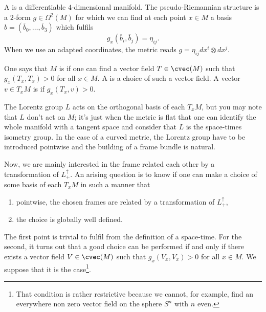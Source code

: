 A  is a differentiable  $4$-dimensional manifold. The pseudo-Riemannian structure is a $2$-form $g\in\Omega^2(M)$ for which we can find at each point $x\in M$ a basis $b=(\overline{ b }_0,\ldots,\overline{ b }_3)$ which fulfils
\[
  g_x(\overline{ b }_i,\overline{ b }_j)=\eta_{ij}.
\]
When we use an adapted coordinates, the metric reads $g=\eta_{ij}dx^i\otimes dx^j$.

One says that $M$ is  if one can find a vector field $T\in\cvec(M)$ such that $g_x(T_x,T_x)>0$ for all $x\in M$. A  is a choice of such a vector field. A vector $v\in T_xM$ is  if $g_x(T_x,v)>0$.

The Lorentz group $L$ acts on the orthogonal basis of each $T_xM$, but you may note that $L$ don't act on $M$; it's just when the metric is flat that one can identify the whole manifold with a tangent space and consider that $L$ is the space-times isometry group. In the case of a curved metric, the Lorentz group have to be introduced pointwise and the building of a frame bundle is natural.

Now, we are mainly interested in the frame related each other by a transformation of $L_+^{\uparrow}$. An arising question is to know if one can make a choice of some basis of each $T_xM$ in such a manner that 

\begin{enumerate}
\item pointwise, the chosen frames are related by a transformation of $L_+^{\uparrow}$,
\item the choice is globally well defined.
\end{enumerate}
The first point is trivial to fulfil from the definition of a space-time. For the second, it turns out that a good choice can be performed if and only if there exists a vector field $V\in\cvec(M)$ such that $g_x(V_x,V_x)>0$ for all $x\in M$. We suppose that it is the case\footnote{That condition is rather restrictive because we cannot, for example, find an everywhere non zero vector field on the sphere $S^n$ with $n$ even.}.

